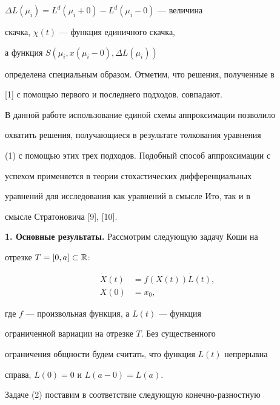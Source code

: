 $\Delta L(\mu_i)=L^d(\mu_i+0)- L^d(\mu_i-0)$ --- величина


скачка, $\chi(t) $ --- функция единичного скачка,


а функция $ S(\mu_i,x(\mu_i-0),\Delta L(\mu_i))$


определена специальным образом. Отметим, что решения, полученные в


[1] с помощью первого и последнего подходов, совпадают.





В данной работе использование единой схемы аппроксимации позволило


охватить решения, получающиеся в результате толкования уравнения


(1) с помощью этих трех подходов. Подобный способ аппроксимации  с


успехом применяется в теории стохастических дифференциальных


уравнений для исследования как уравнений в смысле Ито, так и в


смысле Стратоновича [9], [10].


\medskip





{\bf 1. Основные результаты.} Рассмотрим следующую задачу Коши на


отрезке $T=[0,a]\subset\Bbb{R}$:


\begin{equation}


\begin{split}


\Dot{X}(t)&=f(X(t))\Dot{L}(t), \\


X(0)&=x_0,


\end{split}


\end{equation}


где $f$ --- произвольная функция, а $L(t)$ --- функция


ограниченной вариации на отрезке $ T $. Без существенного


ограничения общности будем считать, что функция $L(t)$ непрерывна


справа, $L(0)=0$ и $L(a-0)=L(a)$.





Задаче (2)  поставим в соответствие следующую конечно-разностную


